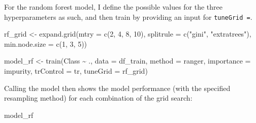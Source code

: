 \documentclass[
]{book}
\newenvironment{Shaded}{\begin{snugshade}}{\end{snugshade}}
\newcommand{\AttributeTok}[1]{\textcolor[rgb]{0.77,0.63,0.00}{#1}}
\newcommand{\DecValTok}[1]{\textcolor[rgb]{0.00,0.00,0.81}{#1}}
\newcommand{\FunctionTok}[1]{\textcolor[rgb]{0.00,0.00,0.00}{#1}}
\newcommand{\NormalTok}[1]{#1}
\newcommand{\OtherTok}[1]{\textcolor[rgb]{0.56,0.35,0.01}{#1}}
\newcommand{\SpecialCharTok}[1]{\textcolor[rgb]{0.00,0.00,0.00}{#1}}
\newcommand{\StringTok}[1]{\textcolor[rgb]{0.31,0.60,0.02}{#1}}
\begin{document}
For the random forest model, I define the possible values for the three hyperparameters as such, and then train by providing an input for \texttt{tuneGrid\ =}.

\begin{Shaded}
\begin{Highlighting}[]
\NormalTok{rf\_grid }\OtherTok{\textless{}{-}} \FunctionTok{expand.grid}\NormalTok{(}\AttributeTok{mtry =} \FunctionTok{c}\NormalTok{(}\DecValTok{2}\NormalTok{, }\DecValTok{4}\NormalTok{, }\DecValTok{8}\NormalTok{, }\DecValTok{10}\NormalTok{), }
                       \AttributeTok{splitrule =} \FunctionTok{c}\NormalTok{(}\StringTok{"gini"}\NormalTok{, }\StringTok{"extratrees"}\NormalTok{), }
                       \AttributeTok{min.node.size =} \FunctionTok{c}\NormalTok{(}\DecValTok{1}\NormalTok{, }\DecValTok{3}\NormalTok{, }\DecValTok{5}\NormalTok{))}

\NormalTok{model\_rf }\OtherTok{\textless{}{-}} \FunctionTok{train}\NormalTok{(Class }\SpecialCharTok{\textasciitilde{}}\NormalTok{ ., }\AttributeTok{data =}\NormalTok{ df\_train, }\AttributeTok{method =} \StringTok{\textquotesingle{}ranger\textquotesingle{}}\NormalTok{,}
                    \AttributeTok{importance =} \StringTok{\textquotesingle{}impurity\textquotesingle{}}\NormalTok{, }\AttributeTok{trControl =}\NormalTok{ tr,}
                    \AttributeTok{tuneGrid =}\NormalTok{ rf\_grid)}
\end{Highlighting}
\end{Shaded}

Calling the model then shows the model performance (with the specified resampling method) for each combination of the grid search:

\begin{Shaded}
\begin{Highlighting}[]
\NormalTok{model\_rf}
\end{Highlighting}
\end{Shaded}
\end{document}
